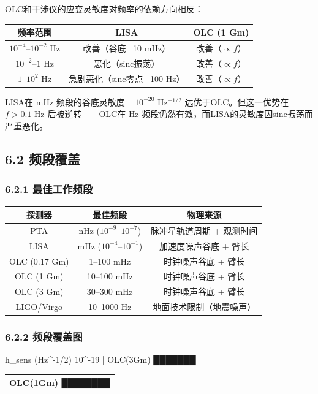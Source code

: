 \documentclass[12pt,a4paper]{article}
\begin{document}
OLC和干涉仪的应变灵敏度对频率的依赖方向相反：

\begin{tabular}{|c|c|c|}
\hline
频率范围 & LISA & OLC (1 Gm) \\
\hline
$10^{-4}$–$10^{-2}$ Hz & 改善（谷底 ~10 mHz） & 改善（$\propto f$） \\
$10^{-2}$–$1$ Hz & 恶化（sinc振荡） & 改善（$\propto f$） \\
$1$–$10^2$ Hz & 急剧恶化（sinc零点 ~100 Hz） & 改善（$\propto f$） \\
\hline
\end{tabular}


LISA在 mHz 频段的谷底灵敏度 ~ $10^{-20}$ Hz$^{-1/2}$ 远优于OLC。但这一优势在 $f > 0.1$ Hz 后被逆转——OLC在 Hz 频段仍然有效，而LISA的灵敏度因sinc振荡而严重恶化。

\subsection{6.2 频段覆盖}


\subsubsection{6.2.1 最佳工作频段}


\begin{tabular}{|c|c|c|}
\hline
探测器 & 最佳频段 & 物理来源 \\
\hline
PTA & nHz ($10^{-9}$–$10^{-7}$) & 脉冲星轨道周期 + 观测时间 \\
LISA & mHz ($10^{-4}$–$10^{-1}$) & 加速度噪声谷底 + 臂长 \\
OLC (0.17 Gm) & 1–100 mHz & 时钟噪声谷底 + 臂长 \\
OLC (1 Gm) & 10–100 mHz & 时钟噪声谷底 + 臂长 \\
OLC (3 Gm) & 30–300 mHz & 时钟噪声谷底 + 臂长 \\
LIGO/Virgo & 10–1000 Hz & 地面技术限制（地震噪声） \\
\hline
\end{tabular}


\subsubsection{6.2.2 频段覆盖图}


h_sens (Hz^-1/2)
10^-19  |                    OLC(3Gm) ███████
\begin{tabular}{|c|}
\hline
OLC(1Gm) ████████ \\
\hline
\hline
\end{tabular}
\end{document}
